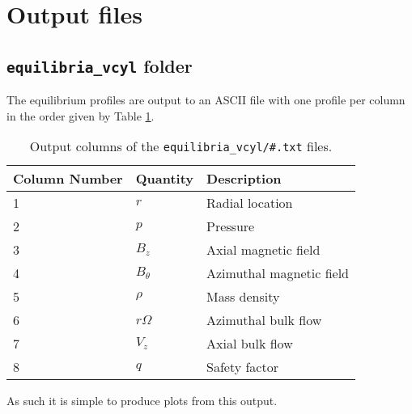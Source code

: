 \documentclass[letterpaper]{article}
\newcommand{\ttt}[1]{\texttt{#1}}
\begin{document}
\section{Output files}
\subsection{\ttt{equilibria\_vcyl} folder}
The equilibrium profiles are output to an ASCII file with one profile per column in the order given by Table \ref{equilib.txt}.  
\begin{table}
\begin{tabular}{|l|l|l|}
\hline
Column Number & Quantity & Description \\
\hline
1&$r$ & Radial location \\
2&$p$ & Pressure \\
3&$B_z$ & Axial magnetic field \\
4&$B_{\theta}$ & Azimuthal magnetic field \\
5&$\rho$ & Mass density \\
6&$r\Omega$ & Azimuthal bulk flow\\
7&$V_z$ & Axial bulk flow \\
8&$q$ & Safety factor \\
\hline
\end{tabular}
\caption{Output columns of the \ttt{equilibria\_vcyl/\#.txt} files.\label{equilib.txt}}
\end{table}
As such it is simple to produce plots from this output.
\end{document}
